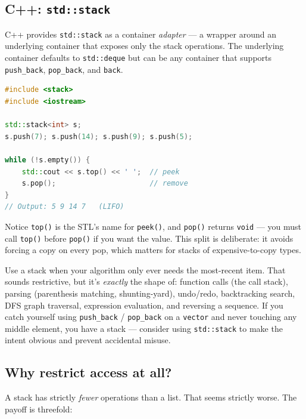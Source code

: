 \documentclass[11pt]{article}
\begin{document}
\subsection*{C++: \texttt{std::stack}}

C++ provides \texttt{std::stack} as a container \emph{adapter} ---
a wrapper around an underlying container that exposes only the
stack operations. The underlying container defaults to
\texttt{std::deque} but can be any container that supports
\texttt{push\_back}, \texttt{pop\_back}, and \texttt{back}.

\begin{examplebox}
\begin{lstlisting}[language=C++,basicstyle=\ttfamily\small,frame=single]
#include <stack>
#include <iostream>

std::stack<int> s;
s.push(7); s.push(14); s.push(9); s.push(5);

while (!s.empty()) {
    std::cout << s.top() << ' ';  // peek
    s.pop();                      // remove
}
// Output: 5 9 14 7   (LIFO)
\end{lstlisting}
\end{examplebox}

Notice \texttt{top()} is the STL's name for \texttt{peek()}, and
\texttt{pop()} returns \texttt{void} --- you must call
\texttt{top()} before \texttt{pop()} if you want the value. This
split is deliberate: it avoids forcing a copy on every pop, which
matters for stacks of expensive-to-copy types.

\begin{ideabox}
Use a stack when your algorithm only ever needs the most-recent
item. That sounds restrictive, but it's \emph{exactly} the shape
of: function calls (the call stack), parsing (parenthesis
matching, shunting-yard), undo/redo, backtracking search, DFS
graph traversal, expression evaluation, and reversing a
sequence. If you catch yourself using \texttt{push\_back} /
\texttt{pop\_back} on a \texttt{vector} and never touching any
middle element, you have a stack --- consider using
\texttt{std::stack} to make the intent obvious and prevent
accidental misuse.
\end{ideabox}

\subsection*{Why restrict access at all?}

A stack has strictly \emph{fewer} operations than a list. That
seems strictly worse. The payoff is threefold:
\end{document}
